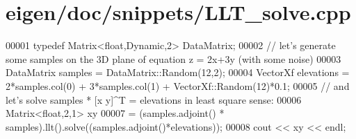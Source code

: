\hypertarget{eigen_2doc_2snippets_2_l_l_t__solve_8cpp_source}{}\section{eigen/doc/snippets/\+L\+L\+T\+\_\+solve.cpp}
\label{eigen_2doc_2snippets_2_l_l_t__solve_8cpp_source}

\begin{DoxyCode}
00001 \textcolor{keyword}{typedef} Matrix<float,Dynamic,2> DataMatrix;
00002 \textcolor{comment}{// let's generate some samples on the 3D plane of equation z = 2x+3y (with some noise)}
00003 DataMatrix samples = DataMatrix::Random(12,2);
00004 VectorXf elevations = 2*samples.col(0) + 3*samples.col(1) + VectorXf::Random(12)*0.1;
00005 \textcolor{comment}{// and let's solve samples * [x y]^T = elevations in least square sense:}
00006 Matrix<float,2,1> xy
00007  = (samples.adjoint() * samples).llt().solve((samples.adjoint()*elevations));
00008 cout << xy << endl;
\end{DoxyCode}
